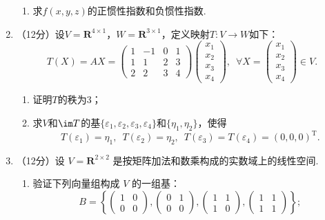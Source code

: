 \begin{enumerate}
\begin{enumerate}
        \item 求$f(x,y,z)$的正惯性指数和负惯性指数.
    \end{enumerate}

    \item （12分）设$V=\mathbf{R}^{4\times 1}$，$W=\mathbf{R}^{3\times 1}$，定义映射$T\colon V\to W$如下：
    \[T(X)=AX=\begin{pmatrix}
        1 & -1 & 0 & 1 \\ 1 & 1 & 2 & 3 \\ 2 & 2 & 3 & 4
    \end{pmatrix}\begin{pmatrix}
        x_1 \\ x_2 \\ x_3 \\ x_4
    \end{pmatrix},\enspace\forall X=\begin{pmatrix}
        x_1 \\ x_2 \\ x_3 \\ x_4
    \end{pmatrix}\in V.\]
    \begin{enumerate}
        \item 证明$T$的秩为3；

        \item 求$V$和$\im T$的基$\{\varepsilon_1,\varepsilon_2,\varepsilon_3,\varepsilon_4\}$和$\{\eta_1,\eta_2\}$，使得
        \[T(\varepsilon_1)=\eta_1,\enspace T(\varepsilon_2)=\eta_2,\enspace T(\varepsilon_3)=T(\varepsilon_4)=(0,0,0)^\mathrm{T}.\]
    \end{enumerate}

    \item （12分）设 $V=\mathbf{R}^{2 \times 2}$ 是按矩阵加法和数乘构成的实数域上的线性空间.
    \begin{enumerate}
        \item 验证下列向量组构成 $V$ 的一组基：
        \[B=\left\{\begin{pmatrix}
        1 & 0 \\ 0 & 0 \end{pmatrix},\begin{pmatrix}
        0 & 1 \\ 0 & 0 \end{pmatrix},\begin{pmatrix}
        1 & 1 \\ 1 & 0 \end{pmatrix},\begin{pmatrix}
        1 & 1 \\ 1 & 1 \end{pmatrix}\right\};\]


\end{enumerate}
\end{enumerate}
